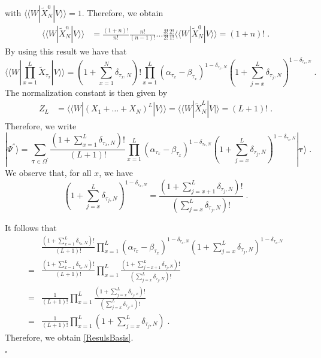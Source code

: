 \documentclass[10pt]{article}
\numberwithin{equation}{section}
\numberwithin{equation}{subsection}
\newcommand{\dt}{\;.}
\begin{document}
with $	 \langle \langle W|  \widetilde{X}_{N}^{0} |V\rangle\rangle =1$. 
Therefore, we obtain 
\begin{align}
	 \langle \langle W|  \widetilde{X}_{N}^{n} |V\rangle\rangle &=%
	\frac{(1+n)!}{n!}\frac{n!}{(n-1)!}\ldots \frac{3!}{2!}\frac{2!}{1!} \langle \langle W|  \widetilde{X}_{N}^{0} |V\rangle\rangle =
	(1+n)!\dt
\end{align}
By using this result we have that
\begin{equation}
	 \langle \langle W|  \prod_{x=1}^{L}\widetilde{X}_{\tau_{x}}
	|V\rangle\rangle=(1+\sum_{x=1}^{N}\delta_{\tau_{x},N})!\prod_{x=1}^{L}\left(\alpha_{\tau_{x}}-\beta_{\tau_{x}}\right)^{1-\delta_{\tau_{x},N}}\left(1+\sum_{j=x}^{L}\delta_{\tau_{j},N}\right)^{1-\delta_{\tau_{x},N}}\dt
\end{equation}
The normalization constant is then given by
\begin{align}
	Z_{L}&= \langle \langle W|  (X_{1}+\ldots+X_{N})^{L} |V\rangle\rangle = \langle \langle W|  \widetilde{X}_{N}^{L}|V|\rangle=
	(L+1)!\dt
\end{align}
Therefore, we write
\begin{equation}\label{resulEsteady}
	|\Psi^{''}\rangle= \sum_{\bm{\tau}\in \Omega^{'}}\frac{(1+\sum_{x=1}^{L}\delta_{\tau_{x},N})!}{(L+1)!}\prod_{x=1}^{L}\left(\alpha_{\tau_{x}}-\beta_{\tau_{x}}\right)^{1-\delta_{\tau_{x},N}}\left(1+\sum_{j=x}^{L}\delta_{\tau_{j},N}\right)^{1-\delta_{\tau_{x},N}}|\bm{\tau}\rangle\dt
\end{equation}
We observe that, for all $x$, we have
\begin{equation}
	\left(1+\sum_{j=x}^{L}\delta_{\tau_{j},N}\right)^{1-\delta_{\tau_{x},N}}=\frac{(1+\sum_{j=x+1}^{L}\delta_{\tau_{j},N})!}{(\sum_{j=x}^{L}\delta_{\tau_{j},N})!}\dt
\end{equation}

It follows that 
\begin{align}\label{remove-exponent}
&\frac{(1+\sum_{x=1}^{L}\delta_{\tau_{x},N})!}{(L+1)!}\prod_{x=1}^{L}\left(\alpha_{\tau_{x}}-\beta_{\tau_{x}}\right)^{1-\delta_{\tau_{x},N}}\left(1+\sum_{j=x}^{L}\delta_{\tau_{j},N}\right)^{1-\delta_{\tau_{x},N}}\nonumber\\
=&\frac{(1+\sum_{x=1}^{L}\delta_{\tau_{x},N})!}{(L+1)!}\prod_{x=1}^{L}\frac{(1+\sum_{j=x+1}^{L}\delta_{\tau_{j},N})!}{(\sum_{j=x}^{L}\delta_{\tau_{j},N})!}\nonumber\\
=&\frac{1}{(L+1)!}\prod_{x=1}^{L}\frac{(1+\sum_{j=x}^{L}\delta_{\tau_{j},x})!}{(\sum_{j=x}^{L}\delta_{\tau_{j},x})!}\nonumber\\
=&\frac{1}{(L+1)!}\prod_{x=1}^{L}\left(1+\sum_{j=x}^{L}\delta_{\tau_{j},N}\right)\dt
\end{align}
Therefore, we obtain \eqref{ResulsBasis}.
\begin{flushright}
	$\square$
\end{flushright} 
\end{document}
